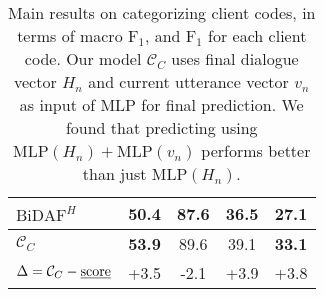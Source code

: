 \begin{table}[!h]
\begin{center}
{\begin{tabular}{lcccc}
$\text{BiDAF}^{H}$                             & 50.4                 & 87.6                   & 36.5                 & 27.1                 \\ \midrule
  $\mathcal{C}_{C}$                            & {\bf 53.9}           & 89.6                   & 39.1                 & {\bf 33.1}           \\
$\Delta=\mathcal{C}_{C} - \text{\underline{score}}$ & {\footnotesize +3.5} & {\footnotesize -2.1}   & {\footnotesize +3.9} & {\footnotesize +3.8} \\
  \bottomrule
\end{tabular}}
\end{center}
\caption{\label{tbl:main_rst_c_categorizing} Main results on categorizing
  client codes, in terms of macro $\text{F}_{1}$, and $\text{F}_{1}$ for
  each client code. Our model $\mathcal{C}_C$ uses final dialogue
  vector $H_{n}$ and current utterance vector $v_{n}$ as input of MLP
  for final prediction. We found that predicting using
  $\text{MLP}(H_{n})+\text{MLP}(v_{n})$ performs better than just
  $\text{MLP}({H_{n}})$.}
\end{table}

